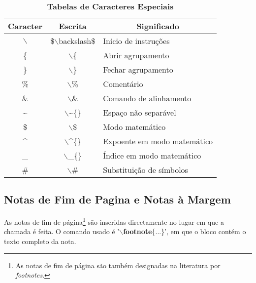 \documentclass[a4paper,12pt]{article}
\begin{document}
\begin{table}[h]
\label{TabSpecial}
\caption{\bf Tabelas de Caracteres Especiais}
\begin{center}
\begin{tabular}{c|c|l}  \hline
\multicolumn{1}{c|}{\bf Caracter} & {\bf Escrita} & 
\multicolumn{1}{c}{\bf Significado} \\ \hline
$\backslash$            &  \$$\backslash$backslash\$ & Início de instruções        \\ \hline
\{                      &  $\backslash$\{            & Abrir agrupamento           \\ \hline
\}                      &  $\backslash$\}            & Fechar agrupamento          \\ \hline
\%                      &  $\backslash$\%            & Comentário                  \\ \hline
\&                      &  $\backslash$\&            & Comando de alinhamento      \\ \hline
\~{}                    &  $\backslash$\~{}\{\}      & Espaço não separável        \\ \hline
\$                      &  $\backslash$\$            & Modo matemático             \\ \hline
\^{}                    &  $\backslash$\^{}\{\}      & Expoente em modo matemático \\ \hline
\_{}                    &  $\backslash$\_{}\{\}      & Índice em modo matemático   \\ \hline
\#                      &  $\backslash$\#            & Substituição de símbolos    \\ \hline
\end{tabular}
\end{center}
\end{table}

\subsection{Notas de Fim de Pagina e Notas à Margem}

As notas de fim de página\footnote{As notas de fim de
página são também designadas na literatura por {\it footnotes}.}
são inseridas directamente no 
lugar em que a chamada é feita. O comando usado é 
'$\backslash${\bf footnote}\{...\}', em que o bloco contém o texto
completo da nota.
\end{document}
